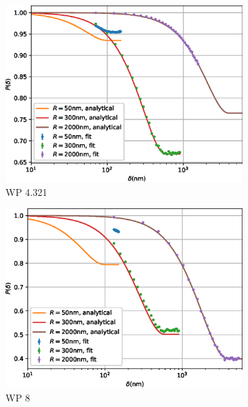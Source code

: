 \begin{figure}[p]
\begin{subfigure}[b]{0.45\textwidth}
		\includegraphics[width=\textwidth]{simulation-plot-rms-WSP-4.321}
		\caption{WP 4.321}
		\label{fig:simulation-plot-rms-WSP-4.321}
	\end{subfigure}
	\hfill
	\begin{subfigure}[b]{0.45\textwidth}
		\centering
		\includegraphics[width=\textwidth]{simulation-plot-rms-WSP-8}
		\caption{WP 8}
		\label{fig:simulation-plot-rms-WSP-8}
	\end{subfigure}
	\centering
	\begin{subfigure}[b]{0.45\textwidth}
		\centering

\end{subfigure}
\end{figure}
